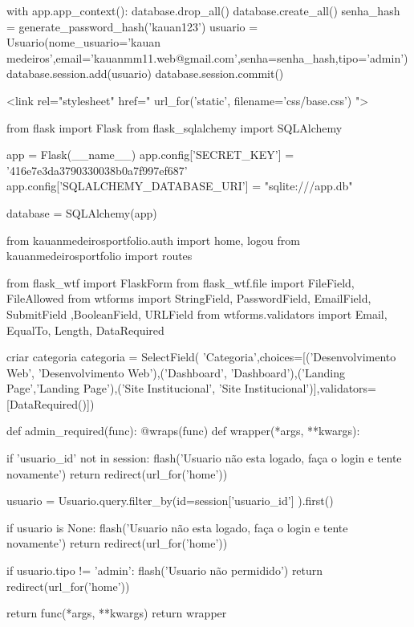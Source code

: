with app.app_context():
    database.drop_all()
    database.create_all()
    senha_hash = generate_password_hash('kauan123')
    usuario = Usuario(nome_usuario='kauan medeiros',email='kauanmm11.web@gmail.com',senha=senha_hash,tipo='admin')
    database.session.add(usuario)
    database.session.commit()
% 


<link rel="stylesheet" href="{{ url_for('static', filename='css/base.css') }}">

%

from flask import Flask
from flask_sqlalchemy import SQLAlchemy

app = Flask(__name__)
app.config['SECRET_KEY'] = '416e7e3da3790330038b0a7f997ef687'
app.config['SQLALCHEMY_DATABASE_URI'] = "sqlite:///app.db"

database = SQLAlchemy(app)

from kauanmedeirosportfolio.auth import home, logou
from kauanmedeirosportfolio import routes
% 

from flask_wtf import FlaskForm
from flask_wtf.file import FileField, FileAllowed
from wtforms import StringField, PasswordField, EmailField, SubmitField ,BooleanField, URLField
from wtforms.validators import Email, EqualTo, Length, DataRequired

criar categoria
categoria = SelectField(
'Categoria',choices=[('Desenvolvimento Web', 'Desenvolvimento Web'),('Dashboard', 'Dashboard'),('Landing Page','Landing Page'),('Site Institucional', 'Site Institucional')],validators=[DataRequired()])
% 

def admin_required(func):
    @wraps(func)
    def wrapper(*args, **kwargs):

        if 'usuario_id' not in session:
           flash('Usuario não esta logado, faça o login e tente novamente')
           return redirect(url_for('home'))

        usuario = Usuario.query.filter_by(id=session['usuario_id']
        ).first()

        if usuario is None:
            flash('Usuario não esta logado, faça o login e tente novamente')
            return redirect(url_for('home'))

        if usuario.tipo != 'admin':
            flash('Usuario não permidido')
            return redirect(url_for('home'))

        return func(*args, **kwargs)
    return wrapper
% 

